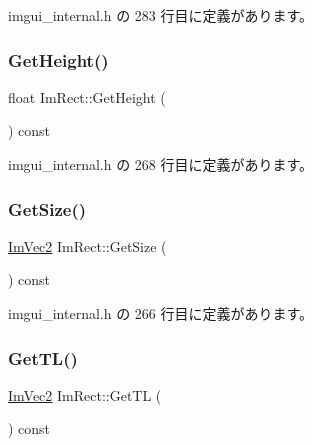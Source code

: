  imgui\+\_\+internal.\+h の 283 行目に定義があります。

\mbox{\label{struct_im_rect_a748d8ae9cb26508951ec6e2f2df0625b}} 
\subsubsection{\texorpdfstring{Get\+Height()}{GetHeight()}}
{\footnotesize\ttfamily float Im\+Rect\+::\+Get\+Height (\begin{DoxyParamCaption}{ }\end{DoxyParamCaption}) const\hspace{0.3cm}{\ttfamily [inline]}}



 imgui\+\_\+internal.\+h の 268 行目に定義があります。

\mbox{\label{struct_im_rect_ae459d9c50003058cfb34519a571aaf33}} 
\subsubsection{\texorpdfstring{Get\+Size()}{GetSize()}}
{\footnotesize\ttfamily \mbox{\hyperlink{struct_im_vec2}{Im\+Vec2}} Im\+Rect\+::\+Get\+Size (\begin{DoxyParamCaption}{ }\end{DoxyParamCaption}) const\hspace{0.3cm}{\ttfamily [inline]}}



 imgui\+\_\+internal.\+h の 266 行目に定義があります。

\mbox{\label{struct_im_rect_a1d4d972329722b51dca4499cb5931b4b}} 
\subsubsection{\texorpdfstring{Get\+T\+L()}{GetTL()}}
{\footnotesize\ttfamily \mbox{\hyperlink{struct_im_vec2}{Im\+Vec2}} Im\+Rect\+::\+Get\+TL (\begin{DoxyParamCaption}{ }\end{DoxyParamCaption}) const\hspace{0.3cm}{\ttfamily [inline]}}



